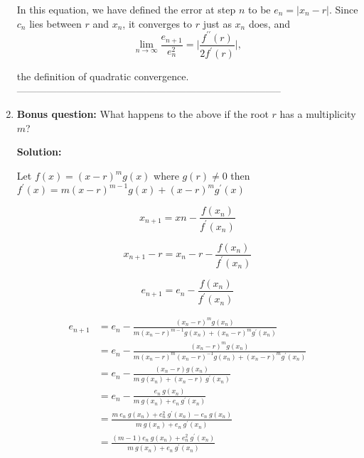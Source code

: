 \documentclass[a4paper,11pt]{report}
\begin{document}
\begin{enumerate}
    In this equation, we have defined  the error at step $n$ to be $e_{n} = |x_{n} - r|$. Since $c_{n}$ lies between $r$ and $x_{n}$, it converges to $r$ just as $x_{n}$ does, and
    \begin{equation*}
    \lim_{n \rightarrow \infty} \frac{e_{n+1}}{e_{n}^2} = \Bigg| \frac{f^{\prime\prime}(r)}{2f^{\prime}(r)} \Bigg|,
    \end{equation*}
    
    the definition of quadratic convergence.    
--------------------------------------------------------------------------------
     





    \item \textbf{Bonus question:} What happens to the above if the root $r$ has
     a multiplicity $m$?
    
    \textbf{Solution:}
    
    Let $f(x) = (x-r)^{m} g(x)$ where $g(r) \neq 0$ then $f^{\prime}(x) = m(x-r)^{m-1} g(x) + (x-r)^{m} g^{\prime}(x)$

    \begin{equation*}
    x_{n+1} = x{n} - \frac{f(x_{n})}{f^{\prime}(x_{n})} 
    \end{equation*}

    \begin{equation*}
    x_{n+1} - r = x_{n} - r - \frac{f(x_{n})}{f^{\prime}(x_{n})}
    \end{equation*}

    \begin{equation*}
    e_{n+1} = e_{n} - \frac{f(x_{n})}{f^{\prime}(x_{n})}
    \end{equation*}

    \begin{equation*}
    \begin{aligned}
    e_{n+1} &= e_{n} - \frac{(x_{n} - r)^{m} g(x_{n})}{m(x_{n} - r)^{m-1} g(x_{n}) + (x_{n} - r)^{m} g^{\prime}(x_{n})} \\
            &= e_{n} - \frac{(x_{n} - r)^{m} g(x_{n})}{m(x_{n} - r)^{m} (x_{n} - r)^{-1} g(x_{n}) + (x_{n} - r)^{m} g^{\prime}(x_{n})} \\
            &= e_{n} - \frac{(x_{n} - r) g(x_{n})}{m\ g(x_{n}) + (x_{n} - r)\ g^{\prime}(x_{n})} \\
            &= e_{n} - \frac{e_{n}\ g(x_{n})}{m\ g(x_{n}) + e_{n}\ g^{\prime}(x_{n})} \\
            &= \frac{m\ e_{n}\ g(x_{n}) + e_{n}^{2}\ g^{\prime}(x_{n}) - e_{n}\ g(x_{n})}{m\ g(x_{n}) + e_{n}\ g^{\prime}(x_{n})} \\
            &= \frac{(m - 1)e_{n}\ g(x_{n}) + e_{n}^{2}\ g^{\prime}(x_{n})}{m\ g(x_{n}) + e_{n}\ g^{\prime}(x_{n})}
    \end{aligned}
    \end{equation*}


\end{enumerate}
\end{document}
